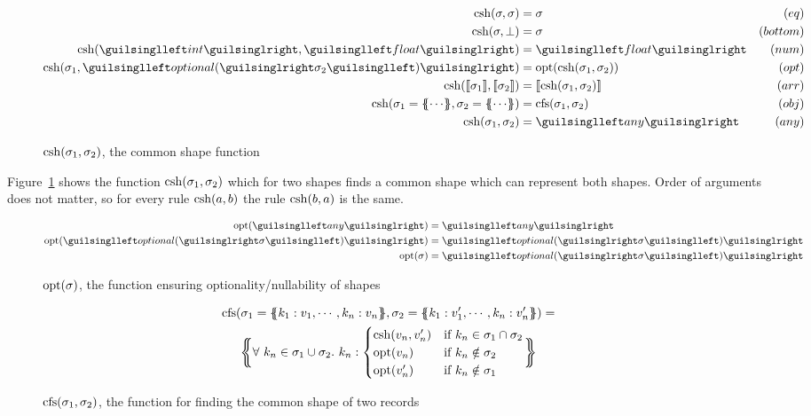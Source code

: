 \begin{figure}[ht!]
\begin{align*}
\csh(\sigma, \sigma)     &=  \sigma          & (eq) \\
\csh(\sigma, \bot)       &=  \sigma          & (bottom) \\
\csh(‹int›, ‹float›)     &= ‹float›          & (num) \\
\csh(\sigma_1, ‹optional(›\sigma_2‹)›) &= \opt(\csh(\sigma_1, \sigma_2))  & (opt) \\
\csh(\vect{\sigma_1}, \vect{\sigma_2}) &= \vect{\csh(\sigma_1, \sigma_2)} & (arr) \\
\csh(\sigma_1 = \recd{ \cdots }, \sigma_2 = \recd{ \cdots }) &= \cfs(\sigma_1, \sigma_2) & (obj) \\
\csh(\sigma_1, \sigma_2) &= ‹any›            & (any)
\end{align*}
\caption{$\operatorname{csh}(\sigma_1, \sigma_2)$, the common shape function}
\label{fig:csh}
\end{figure}

Figure~\ref{fig:csh} shows the function $\operatorname{csh}(\sigma_1, \sigma_2)$ which for two shapes finds a common shape which can represent both shapes. Order of arguments does not matter, so for every rule $\operatorname{csh}(a, b)$ the rule $\operatorname{csh}(b, a)$ is the same.

\begin{figure}[ht!]
\begin{align*}
\opt(‹any›)                &= ‹any› \\
\opt(‹optional(›\sigma‹)›) &= ‹optional(›\sigma‹)› \\
\opt(\sigma)               &= ‹optional(›\sigma‹)›
\end{align*}
\caption{$\operatorname{opt}(\sigma)$, the function ensuring optionality/nullability of shapes}
\label{fig:opt}
\end{figure}

\begin{figure}[ht!]
\begin{gather*}
\cfs(\sigma_1 = \recd{ k_1 : v_1, \cdots, k_n : v_n }, \sigma_2 = \recd{ k_1 : v'_1, \cdots, k_n : v'_n }) = \\
\recd[\bigg]{
\forall\ k_n \in \sigma_1 \cup \sigma_2 .\ k_n : \begin{cases}
  \csh(v_n, v'_n) & \text{if } k_n \in \sigma_1 \cap \sigma_2 \\
  \opt(v_n) & \text{if } k_n \notin \sigma_2 \\
  \opt(v'_n) & \text{if } k_n \notin \sigma_1
\end{cases}
}
\end{gather*}
\caption{$\operatorname{cfs}(\sigma_1, \sigma_2)$, the function for finding the common shape of two records}
\label{fig:cfs}
\end{figure}

